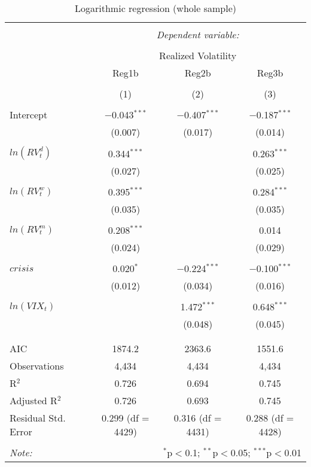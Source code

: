 
\begin{table}[!htbp] \centering 
  \caption{Logarithmic regression (whole sample)} 
  \label{} 
\begin{tabular}{@{\extracolsep{5pt}}lccc} 
\\[-1.8ex]\hline 
\hline \\[-1.8ex] 
 & \multicolumn{3}{c}{\textit{Dependent variable:}} \\ 
\cline{2-4} 
\\[-1.8ex] & \multicolumn{3}{c}{Realized Volatility} \\ 
 & Reg1b & Reg2b & Reg3b \\ 
\\[-1.8ex] & (1) & (2) & (3)\\ 
\hline \\[-1.8ex] 
 Intercept & $-$0.043$^{***}$ & $-$0.407$^{***}$ & $-$0.187$^{***}$ \\ 
  & (0.007) & (0.017) & (0.014) \\ 
  & & & \\ 
 $ln(RV^{d}_{t})$ & 0.344$^{***}$ &  & 0.263$^{***}$ \\ 
  & (0.027) &  & (0.025) \\ 
  & & & \\ 
 $ln(RV^{w}_{t})$ & 0.395$^{***}$ &  & 0.284$^{***}$ \\ 
  & (0.035) &  & (0.035) \\ 
  & & & \\ 
 $ ln(RV^{m}_{t})$ & 0.208$^{***}$ &  & 0.014 \\ 
  & (0.024) &  & (0.029) \\ 
  & & & \\ 
 $crisis$ & 0.020$^{*}$ & $-$0.224$^{***}$ & $-$0.100$^{***}$ \\ 
  & (0.012) & (0.034) & (0.016) \\ 
  & & & \\ 
 $ln(VIX_{t})$ &  & 1.472$^{***}$ & 0.648$^{***}$ \\ 
  &  & (0.048) & (0.045) \\ 
  & & & \\ 
\hline \\[-1.8ex] 
AIC & 1874.2 & 2363.6 & 1551.6 \\ 
Observations & 4,434 & 4,434 & 4,434 \\ 
R$^{2}$ & 0.726 & 0.694 & 0.745 \\ 
Adjusted R$^{2}$ & 0.726 & 0.693 & 0.745 \\ 
Residual Std. Error & 0.299 (df = 4429) & 0.316 (df = 4431) & 0.288 (df = 4428) \\ 
\hline 
\hline \\[-1.8ex] 
\textit{Note:}  & \multicolumn{3}{r}{$^{*}$p$<$0.1; $^{**}$p$<$0.05; $^{***}$p$<$0.01} \\ 
\end{tabular} 
\end{table} 
